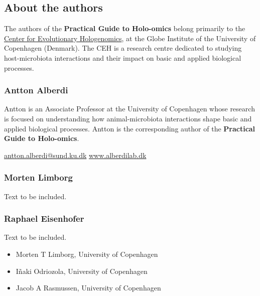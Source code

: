 \documentclass[
]{book}
\providecommand{\tightlist}{%
  \setlength{\itemsep}{0pt}\setlength{\parskip}{0pt}}
\begin{document}
\hypertarget{about-the-authors}{%
\subsection*{About the authors}\label{about-the-authors}}

The authors of the \textbf{Practical Guide to Holo-omics} belong primarily to the \href{https://ceh.ku.dk/}{Center for Evolutionary Hologenomics}, at the Globe Institute of the University of Copenhagen (Denmark). The CEH is a research centre dedicated to studying host-microbiota interactions and their impact on basic and applied biological processes.

\hypertarget{antton-alberdi}{%
\subsubsection*{Antton Alberdi}\label{antton-alberdi}}

Antton is an Associate Professor at the University of Copenhagen whose research is focused on understanding how animal-microbiota interactions shape basic and applied biological processes. Antton is the corresponding author of the \textbf{Practical Guide to Holo-omics}.

\url{antton.alberdi@sund.ku.dk} \textbar{} \url{www.alberdilab.dk}

\hypertarget{morten-limborg}{%
\subsubsection*{Morten Limborg}\label{morten-limborg}}

Text to be included.

\hypertarget{raphael-eisenhofer}{%
\subsubsection*{Raphael Eisenhofer}\label{raphael-eisenhofer}}

Text to be included.

\begin{itemize}
\tightlist
\item
  Morten T Limborg, University of Copenhagen
\item
  Iñaki Odriozola, University of Copenhagen
\item
  Jacob A Rasmussen, University of Copenhagen
\end{itemize}
\end{document}
